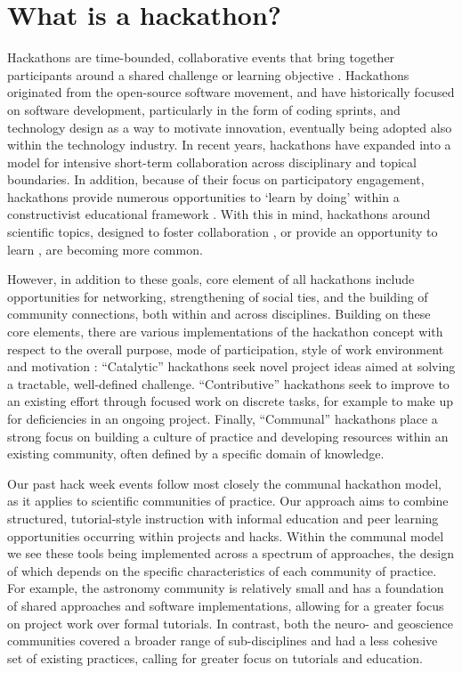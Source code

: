 \section*{What is a hackathon?}

Hackathons are time-bounded, collaborative events that bring together participants around a shared challenge or learning objective \cite{Decker2015}.
Hackathons originated from the open-source software movement, and have historically focused on software development, particularly in the form of coding sprints, and technology design as a way to motivate innovation, eventually being adopted also within the technology industry.
In recent years, hackathons have expanded into a model for intensive short-term collaboration across disciplinary and topical boundaries.
In addition, because of their focus on participatory engagement, hackathons provide numerous opportunities to `learn by doing' within a constructivist educational framework \cite{Bransford2000-lu,Papert1980-fh}.
With this in mind, hackathons around scientific topics, designed to foster collaboration \cite{Groen2015-cj,Moller2013-ah}, or provide an opportunity to learn \cite{Kienzler2015-zu,Lamers2014-xf}, are becoming more common.

However, in addition to these goals, core element of all hackathons include opportunities for networking, strengthening of social ties, and the building of community connections, both within and across disciplines.
Building on these core elements, there are various implementations of the hackathon concept with respect to the overall purpose, mode of participation, style of work environment and motivation \cite{Drouhard2017}:
``Catalytic'' hackathons seek novel project ideas aimed at solving a tractable, well-defined challenge.
``Contributive'' hackathons seek to improve to an existing effort through focused work on discrete tasks, for example to make up for deficiencies in an ongoing project.
Finally, ``Communal'' hackathons place a strong focus on building a culture of practice and developing resources within an existing community, often defined by a specific domain of knowledge.

Our past hack week events follow most closely the communal hackathon model, as it applies to scientific communities of practice.
Our approach aims to combine structured, tutorial-style instruction with informal education and peer learning opportunities occurring within projects and hacks.
Within the communal model we see these tools being implemented across a spectrum of approaches, the design of which depends on the specific characteristics of each community of practice.
For example, the astronomy community is relatively small and has a foundation of shared approaches and software implementations, allowing for a greater focus on project work over formal tutorials.
In contrast, both the neuro- and geoscience communities covered a broader range of sub-disciplines and had a less cohesive set of existing practices, calling for greater focus on tutorials and education.

